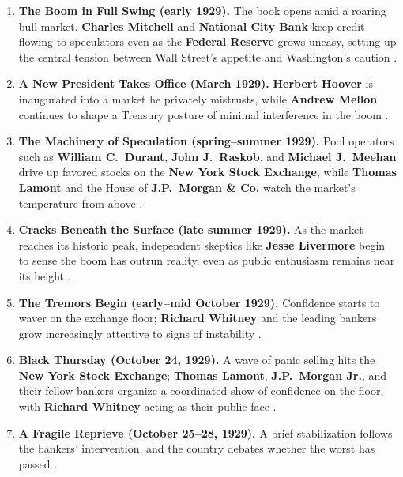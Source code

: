 \documentclass[11pt]{article}
\newcommand{\charname}[1]{\textbf{#1}}
\begin{document}
\begin{enumerate}[leftmargin=1.6em, itemsep=0.6em]

\item \textbf{The Boom in Full Swing (early 1929).} The book opens amid a
roaring bull market. \charname{Charles Mitchell} and \charname{National City Bank}
keep credit flowing to speculators even as the \charname{Federal Reserve} grows
uneasy, setting up the central tension between Wall Street's appetite and
Washington's caution \autocite{airmail1929,supersummary1929}.

\item \textbf{A New President Takes Office (March 1929).} \charname{Herbert Hoover}
is inaugurated into a market he privately mistrusts, while \charname{Andrew Mellon}
continues to shape a Treasury posture of minimal interference in the boom
\autocite{supersummary1929,csmonitor1929}.

\item \textbf{The Machinery of Speculation (spring--summer 1929).} Pool operators
such as \charname{William C.\ Durant}, \charname{John J.\ Raskob}, and
\charname{Michael J.\ Meehan} drive up favored stocks on the \charname{New York
Stock Exchange}, while \charname{Thomas Lamont} and the House of \charname{J.P.\
Morgan \& Co.} watch the market's temperature from above \autocite{supersummary1929}.

\item \textbf{Cracks Beneath the Surface (late summer 1929).} As the market reaches
its historic peak, independent skeptics like \charname{Jesse Livermore} begin to
sense the boom has outrun reality, even as public enthusiasm remains near its height
\autocite{airmail1929,mises1929}.

\item \textbf{The Tremors Begin (early--mid October 1929).} Confidence starts to
waver on the exchange floor; \charname{Richard Whitney} and the leading bankers
grow increasingly attentive to signs of instability \autocite{supersummary1929}.

\item \textbf{Black Thursday (October 24, 1929).} A wave of panic selling hits the
\charname{New York Stock Exchange}; \charname{Thomas Lamont}, \charname{J.P.\
Morgan Jr.}, and their fellow bankers organize a coordinated show of confidence on
the floor, with \charname{Richard Whitney} acting as their public face
\autocite{supersummary1929,csmonitor1929}.

\item \textbf{A Fragile Reprieve (October 25--28, 1929).} A brief stabilization
follows the bankers' intervention, and the country debates whether the worst has
passed \autocite{supersummary1929}.


\end{enumerate}
\end{document}
